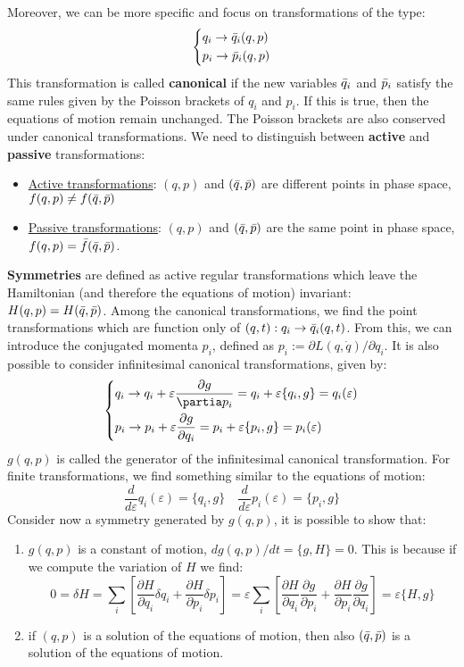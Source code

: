 \documentclass[../main.tex]{subfiles}
\begin{document}
Moreover, we can be more specific and focus on transformations of the type:
\[
\left\{
\begin{aligned}
&q_i\to\Bar{q}_i(q,p)\\
&p_i\to\Bar{p}_i(q,p)
\end{aligned}
\right.
\]
This transformation is called \textbf{canonical} if the new variables $\Bar{q}_i$ and $\Bar{p}_i$ satisfy the same rules given by the Poisson brackets of $q_i$ and $p_i$. If this is true, then the equations of motion remain unchanged. The Poisson brackets are also conserved under canonical transformations. We need to distinguish between \textbf{active} and \textbf{passive} transformations:
\begin{itemize}
    \item \underline{Active transformations}: $(q,p)$ and $(\Bar{q},\Bar{p})$ are different points in phase space, $f(q,p)\neq f(\Bar{q},\Bar{p})$
    \item \underline{Passive transformations}: $(q,p)$ and $(\Bar{q},\Bar{p})$ are the same point in phase space, $f(q,p)=\Bar{f}(\Bar{q},\Bar{p})$.
\end{itemize}
\textbf{Symmetries} are defined as active regular transformations which leave the Hamiltonian (and therefore the equations of motion) invariant:\\
$H(q,p)=H(\Bar{q},\Bar{p})$. Among the canonical transformations, we find the point transformations which are function only of $(q,t): q_i\to\Bar{q}_i(q,t)$. From this, we can introduce the conjugated momenta $p_i$, defined as $p_i:=\partial L(q,\Dot{q})/\partial q_i$. It is also possible to consider infinitesimal canonical transformations, given by:
\[
\left\{
\begin{aligned}
&q_i\to q_i+\varepsilon\frac{\partial g}{\partia p_i}=q_i+\varepsilon\{q_i,g\}=q_i(\varepsilon)\\
&p_i\to p_i+\varepsilon\frac{\partial g}{\partial q_i}=p_i+\varepsilon\{p_i,g\}=p_i(\varepsilon)
\end{aligned}
\right.
\]
$g(q,p)$ is called the generator of the infinitesimal canonical transformation. For finite transformations, we find something similar to the equations of motion:
\[
\frac{d}{d\varepsilon}q_i(\varepsilon)=\{q_i,g\} \quad \frac{d}{d\varepsilon}p_i(\varepsilon)=\{p_i,g\}
\]
Consider now a symmetry generated by $g(q,p)$, it is possible to show that:
\begin{enumerate}
    \item $g(q,p)$ is a constant of motion, $dg(q,p)/dt=\{g,H\}=0$. This is because if we compute the variation of $H$ we find:
    \[
    0=\delta H=\sum_i\left[\frac{\partial H}{\partial q_i}\delta q_i+\frac{\partial H}{\partial p_i}\delta p_i\right]=\varepsilon\sum_i\left[\frac{\partial H}{\partial q_i}\frac{\partial g}{\partial p_i}+\frac{\partial H}{\partial p_i}\frac{\partial g}{\partial q_i}\right]=\varepsilon\{H,g\}
    \]
    \item if $(q,p)$ is a solution of the equations of motion, then also $(\Bar{q},\Bar{p})$ is a solution of the equations of motion.
\end{enumerate}
\end{document}
